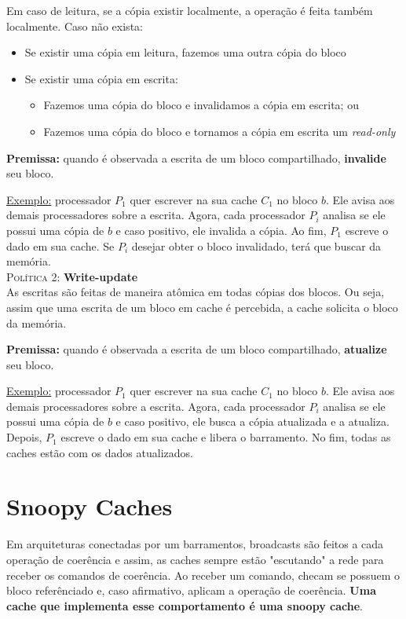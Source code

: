 Em caso de leitura, se a cópia existir localmente, a operação é feita também localmente. Caso não exista:
\begin{itemize}
  \item Se existir uma cópia em leitura, fazemos uma outra cópia do bloco

  \item Se existir uma cópia em escrita:
  \begin{itemize}
    \item Fazemos uma cópia do bloco e invalidamos a cópia em escrita; ou
    \item Fazemos uma cópia do bloco e tornamos a cópia em escrita um \textit{read-only}
  \end{itemize}
\end{itemize}

\textbf{Premissa:} quando é observada a escrita de um bloco compartilhado, \textbf{invalide} seu bloco.

\underline{Exemplo:} processador $P_1$ quer escrever na sua cache $C_1$ no bloco $b$. Ele avisa aos demais processadores sobre a escrita. Agora, cada processador $P_i$ analisa se ele possui uma cópia de $b$ e caso positivo, ele invalida a cópia. Ao fim, $P_1$ escreve o dado em sua cache. Se $P_i$ desejar obter o bloco invalidado, terá que buscar da memória.\\


\textsc{Política 2:} \textbf{Write-update}\\
As escritas são feitas de maneira atômica em todas cópias dos blocos. Ou seja, assim que uma escrita de um bloco em cache é percebida, a cache solicita o bloco da memória.

\textbf{Premissa:} quando é observada a escrita de um bloco compartilhado, \textbf{atualize} seu bloco.

\underline{Exemplo:} processador $P_1$ quer escrever na sua cache $C_1$ no bloco $b$. Ele avisa aos demais processadores sobre a escrita. Agora, cada processador $P_i$ analisa se ele possui uma cópia de $b$ e caso positivo, ele busca a cópia atualizada e a atualiza. Depois, $P_1$ escreve o dado em sua cache e libera o barramento. No fim, todas as caches estão com os dados atualizados.





\section{Snoopy Caches}
Em arquiteturas conectadas por um barramentos, broadcasts são feitos a cada operação de coerência e assim, as caches sempre estão "escutando" a rede para receber os comandos de coerência. Ao receber um comando, checam se possuem o bloco referênciado e, caso afirmativo, aplicam a operação de coerência. \textbf{Uma cache que implementa esse comportamento é uma snoopy cache}.

